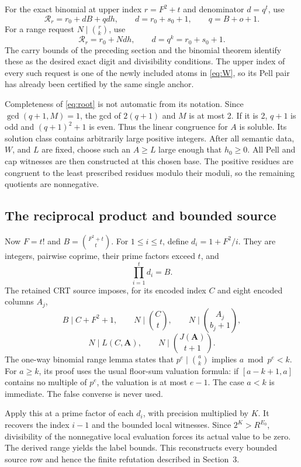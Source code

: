 \documentclass[11pt,letterpaper]{article}
\theoremstyle{remark}\newtheorem{remark}[theorem]{Remark}
\begin{document}
For the exact binomial at upper index $r=F^2+t$ and denominator $d=q^t$,
use
\[
 \mathcal R_r=r_0+dB+qd h,\qquad
 d=r_0+s_0+1,\qquad q=B+o+1.
\]
For a range request $N\mid\binom{r}{k}$, use
\[
 \mathcal R_r=r_0+Nd h,\qquad d=q^k=r_0+s_0+1.
\]
The carry bounds of the preceding section and the binomial theorem
identify these as the desired exact digit and divisibility conditions.
The upper index of every such request is one of the newly included atoms
in \eqref{eq:W}, so its Pell pair has already been certified by the same
single anchor.

Completeness of \eqref{eq:root} is not automatic from its notation.
Since $\gcd(q+1,M)=1$, the gcd of $2(q+1)$ and $M$ is at most 2.
If it is 2, $q+1$ is odd and $(q+1)^2+1$ is even.  Thus the linear
congruence for $A$ is soluble.  Its solution class contains arbitrarily
large positive integers.  After all semantic data, $W$, and $L$ are fixed,
choose such an $A\ge L$ large enough that $h_0\ge0$.  All Pell and cap
witnesses are then constructed at this chosen base.  The positive residues
are congruent to the least prescribed residues modulo their moduli, so
the remaining quotients are nonnegative.

\subsection{The reciprocal product and bounded source}

Now $F=t!$ and $B=\binom{F^2+t}{t}$.  For $1\le i\le t$, define
$d_i=1+F^2/i$.  They are integers, pairwise coprime, their prime factors
exceed $t$, and
\[
 \prod_{i=1}^t d_i=B.
\]
The retained CRT source imposes, for its encoded index $C$ and eight
encoded columns $A_j$,
\[
 B\mid C+F^2+1,\qquad N\mid\binom C t,
 \qquad N\mid\binom{A_j}{b_j+1},
\]
\[
 N\mid L(C,\mathbf A),\qquad
 N\mid\binom{J(\mathbf A)}{t+1}.
\]
The one-way binomial range lemma states that
$p^e\mid\binom ak$ implies $a\bmod p^e<k$.  For $a\ge k$, its proof
uses the usual floor-sum valuation formula: if $[a-k+1,a]$ contains no
multiple of $p^e$, the valuation is at most $e-1$.  The case $a<k$ is
immediate.  The false converse is never used.

Apply this at a prime factor of each $d_i$, with precision multiplied by
$K$.  It recovers the index $i-1$ and the bounded local witnesses.  Since
$2^K>R^{E_0}$, divisibility of the nonnegative local evaluation forces its
actual value to be zero.  The derived range yields the label bounds.
This reconstructs every bounded source row and hence the finite refutation
described in Section~3.
\end{document}
